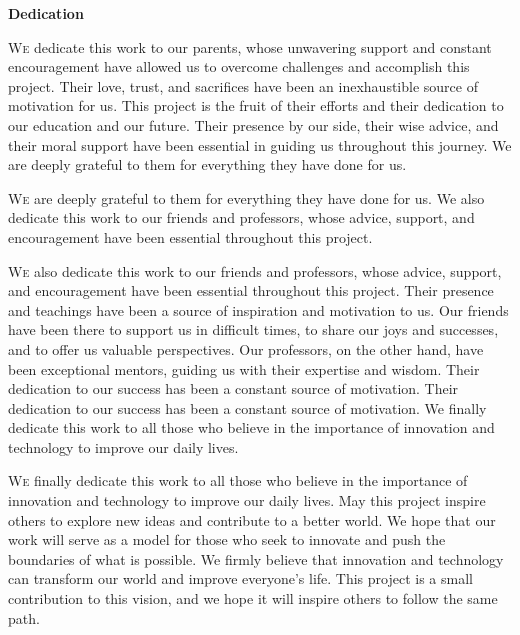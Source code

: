 \documentclass[12pt]{article}
\begin{document}
\begin{center}
    \Large \textbf{Dedication}
\end{center}

\vspace{1cm}

\lettrine{W}{e} dedicate this work to our parents, whose unwavering support and constant encouragement have allowed us to overcome challenges and accomplish this project. Their love, trust, and sacrifices have been an inexhaustible source of motivation for us. This project is the fruit of their efforts and their dedication to our education and our future. Their presence by our side, their wise advice, and their moral support have been essential in guiding us throughout this journey. We are deeply grateful to them for everything they have done for us.

\vspace{0.5cm}

\lettrine{W}{e} are deeply grateful to them for everything they have done for us. We also dedicate this work to our friends and professors, whose advice, support, and encouragement have been essential throughout this project.

\vspace{0.5cm}

\lettrine{W}{e} also dedicate this work to our friends and professors, whose advice, support, and encouragement have been essential throughout this project. Their presence and teachings have been a source of inspiration and motivation to us. Our friends have been there to support us in difficult times, to share our joys and successes, and to offer us valuable perspectives. Our professors, on the other hand, have been exceptional mentors, guiding us with their expertise and wisdom. Their dedication to our success has been a constant source of motivation. Their dedication to our success has been a constant source of motivation. We finally dedicate this work to all those who believe in the importance of innovation and technology to improve our daily lives.

\vspace{0.5cm}

\lettrine{W}{e} finally dedicate this work to all those who believe in the importance of innovation and technology to improve our daily lives. May this project inspire others to explore new ideas and contribute to a better world. We hope that our work will serve as a model for those who seek to innovate and push the boundaries of what is possible. We firmly believe that innovation and technology can transform our world and improve everyone's life. This project is a small contribution to this vision, and we hope it will inspire others to follow the same path.
\end{document}
